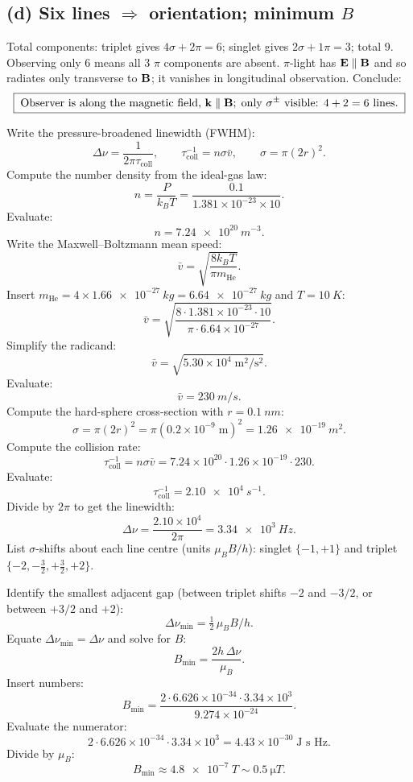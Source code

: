 \documentclass[11pt]{article}
\begin{document}
\subsection*{(d) Six lines $\Rightarrow$ orientation; minimum $B$}

Total components: triplet gives $4\sigma + 2\pi = 6$; singlet gives $2\sigma+1\pi=3$; total 9. Observing only 6 means all 3 $\pi$ components are absent. $\pi$-light has $\vb E\parallel\vb B$ and so radiates only transverse to $\vb B$; it vanishes in longitudinal observation. Conclude:
\[
\boxed{\;\text{Observer is along the magnetic field, }\vb k\parallel\vb B;\;\text{only }\sigma^\pm\text{ visible: }4+2=6\text{ lines.}\;}
\]

Write the pressure-broadened linewidth (FWHM):
\[
\Delta\nu = \frac{1}{2\pi\tau_\text{coll}},\qquad \tau_\text{coll}^{-1} = n\sigma\bar v,\qquad \sigma=\pi(2r)^2.
\]
Compute the number density from the ideal-gas law:
\[
n = \frac{P}{k_B T} = \frac{0.1}{1.381\times 10^{-23}\times 10}.
\]
Evaluate:
\[
n = \SI{7.24e20}{m^{-3}}.
\]
Write the Maxwell--Boltzmann mean speed:
\[
\bar v = \sqrt{\frac{8k_B T}{\pi m_\text{He}}}.
\]
Insert $m_\text{He}=4\times\SI{1.66e-27}{kg}=\SI{6.64e-27}{kg}$ and $T=\SI{10}{K}$:
\[
\bar v = \sqrt{\frac{8\cdot 1.381\times 10^{-23}\cdot 10}{\pi\cdot 6.64\times 10^{-27}}}.
\]
Simplify the radicand:
\[
\bar v = \sqrt{5.30\times 10^{4}\;\text{m}^2/\text{s}^2}.
\]
Evaluate:
\[
\bar v = \SI{230}{m/s}.
\]
Compute the hard-sphere cross-section with $r=\SI{0.1}{nm}$:
\[
\sigma = \pi(2r)^2 = \pi(0.2\times 10^{-9}\;\text{m})^2 = \SI{1.26e-19}{m^2}.
\]
Compute the collision rate:
\[
\tau_\text{coll}^{-1} = n\sigma\bar v = 7.24\times 10^{20}\cdot 1.26\times 10^{-19}\cdot 230.
\]
Evaluate:
\[
\tau_\text{coll}^{-1} = \SI{2.10e4}{s^{-1}}.
\]
Divide by $2\pi$ to get the linewidth:
\[
\Delta\nu = \frac{2.10\times 10^{4}}{2\pi} = \SI{3.34e3}{Hz}.
\]
List $\sigma$-shifts about each line centre (units $\mu_B B/h$): singlet $\{-1,+1\}$ and triplet $\{-2,-\tfrac{3}{2},+\tfrac{3}{2},+2\}$.

Identify the smallest adjacent gap (between triplet shifts $-2$ and $-3/2$, or between $+3/2$ and $+2$):
\[
\Delta\nu_\text{min} = \tfrac{1}{2}\,\mu_B B/h.
\]
Equate $\Delta\nu_\text{min}=\Delta\nu$ and solve for $B$:
\[
B_\text{min} = \frac{2 h\,\Delta\nu}{\mu_B}.
\]
Insert numbers:
\[
B_\text{min} = \frac{2\cdot 6.626\times 10^{-34}\cdot 3.34\times 10^{3}}{9.274\times 10^{-24}}.
\]
Evaluate the numerator:
\[
2\cdot 6.626\times 10^{-34}\cdot 3.34\times 10^{3} = 4.43\times 10^{-30}\;\text{J s Hz}.
\]
Divide by $\mu_B$:
\[
\boxed{\;B_\text{min}\approx\SI{4.8e-7}{T}\sim\SI{0.5}{\micro T}.\;}
\]
\end{document}
